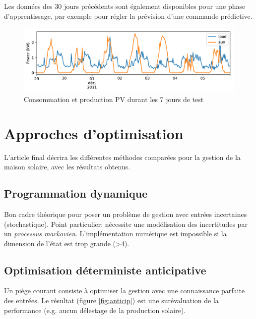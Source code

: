 \documentclass[a4paper,10pt,twocolumn]{article}
\begin{document}
Les données des 30 jours précédents sont également disponibles pour une phase d'apprentissage,
par exemple pour régler la prévision d'une commande prédictive.


\begin{figure}[!ht]
        \begin{center}
                \includegraphics[width=1\columnwidth]{figures/data_week_2011-11-29.pdf}
        \end{center}

        \caption{Consommation et production PV durant les 7 jours de test
        }
        \label{fig:testdata}
\end{figure}


\section{Approches d'optimisation}
\label{s:opt_meth}

L'article final décrira les différentes méthodes comparées pour la gestion de la maison solaire,
avec les résultats obtenus.

\subsection{Programmation dynamique}
Bon cadre théorique pour poser un problème de gestion avec entrées incertaines (stochastique).
Point particulier: nécessite une modélisation des incertitudes par un \emph{processus markovien}\cite{Haessig:2013:ESPy}.
L'implémentation numérique est impossible si la dimension de l'état est trop grande (>4).


\subsection{Optimisation déterministe anticipative}

Un piège courant consiste à optimiser la gestion avec une connaissance parfaite des entrées.
Le résultat (figure \ref{fig:anticip}) est une surévaluation de la performance (e.g. aucun délestage de la production solaire).
\end{document}
